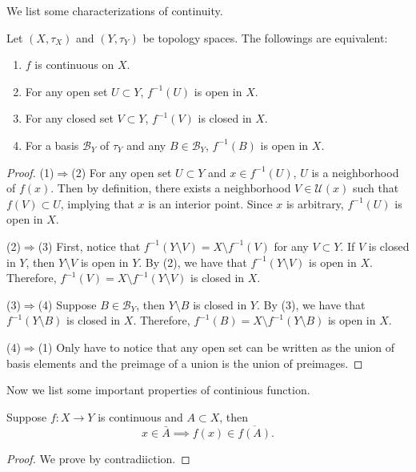 We list some characterizations of continuity.
\begin{proposition}
    Let $(X,\tau_X)$ and $(Y,\tau_Y)$ be topology spaces. The followings are equivalent:
    \begin{enumerate}
        \item $f$ is continuous on $X$.
        \item For any open set $U \subset Y$, $f^{-1}(U)$ is open in $X$.
        \item For any closed set $V \subset Y$, $f^{-1}(V)$ is closed in $X$.
        \item For a basis $\mathcal{B}_{Y}$ of $\tau_Y$ and any $B \in \mathcal{B}_{Y}$, $f^{-1}(B)$ is open in $X$.
    \end{enumerate}
\end{proposition}
\begin{proof}

    (1)$\Rightarrow$(2) For any open set $U \subset Y$ and $x\in f^{-1}(U)$, $U$ is a neighborhood of $f(x)$. Then by definition, there exists a neighborhood $V\in \mathcal{U}(x)$ such that $f(V) \subset U$, implying that $x$ is an interior point. Since $x$ is arbitrary, $f^{-1}(U)$ is open in $X$.
 
    (2)$\Rightarrow$(3) First, notice that $f^{-1}(Y\setminus V) = X\setminus f^{-1}(V)$ for any $V\subset Y$. If $V$ is closed in $Y$, then $Y\setminus V$ is open in $Y$. By (2), we have that $f^{-1}(Y\setminus V)$ is open in $X$. Therefore, $f^{-1}(V) = X\setminus f^{-1}(Y\setminus V)$ is closed in $X$.

    (3)$\Rightarrow$(4) Suppose $B\in \mathcal{B}_{Y}$, then $Y\setminus B$ is closed in $Y$. By (3), we have that $f^{-1}(Y\setminus B)$ is closed in $X$. Therefore, $f^{-1}(B) = X\setminus f^{-1}(Y\setminus B)$ is open in $X$.

    (4)$\Rightarrow$(1) Only have to notice that any open set can be written as the union of basis elements and the preimage of a union is the union of preimages.
\end{proof}

Now we list some important properties of continious function.
\begin{theorem}
    Suppose $f:X\to Y$ is continuous and $A\subset X$, then $$x\in \bar{A} \implies f(x)\in \overline{f(A)}.$$  
\end{theorem}
\begin{proof}
    We prove by contradiiction. 
\end{proof}

